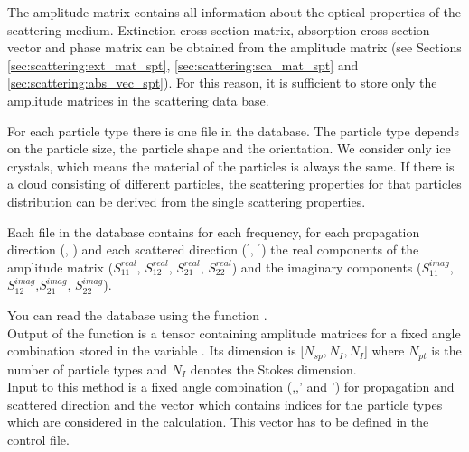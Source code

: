 The amplitude matrix contains all information about the optical
properties of the scattering medium. Extinction cross section
matrix, absorption cross section vector and phase matrix can be
obtained from the amplitude matrix (see Sections
\ref{sec:scattering:ext_mat_spt}, \ref{sec:scattering:sca_mat_spt}  and
\ref{sec:scattering:abs_vec_spt}).
For this reason, it is sufficient to store only the amplitude matrices
in the scattering data base. 

For each particle type there is one file in the database.
The particle type depends on the particle size, the particle shape and the
orientation. We consider only ice crystals, which means the material of the
particles is always the same. If there is a cloud consisting of
different particles, the scattering properties for that particles
distribution can be derived from the single scattering properties.

Each file in the database contains for each frequency, for each propagation
direction (\ScaZa, \ScaAa) and each scattered direction
 (\ScaZa$^\prime$, \ScaAa$^\prime$) the real
components of the amplitude matrix ($S^{real}_{11}$, $S^{real}_{12}$,
$S^{real}_{21}$, $S^{real}_{22}$) and the imaginary components
($S^{imag}_{11}$, $S^{imag}_{12}$,$S^{imag}_{21}$, $S^{imag}_{22}$).

You can read the database using the function
.\\
Output of the function is a tensor containing amplitude matrices for
a fixed angle combination stored in the variable
. Its dimension is [$N_{sp}, N_{I}, N_{I}$]
where $N_{pt}$ is the number of particle
types  and $N_{I}$ denotes the Stokes dimension.\\
Input to this method is a fixed angle
combination  (,,' and
') for propagation and scattered direction and the vector
 which contains indices for the  particle types
which are considered in the calculation. This vector has to be defined
in the control file.


\label{sec:scattering:gen_atmprop}

\label{sec:scattering:gen_ext}

\label{sec:scattering:ext_mat_agenda}

